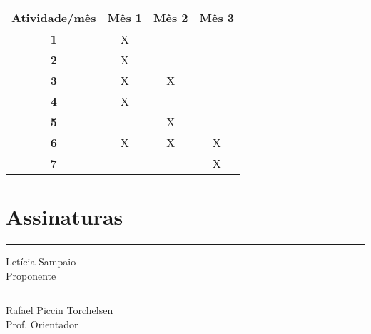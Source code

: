 \documentclass[tcc-proposta]{texufpel}
\begin{document}
\begin{table}[]
\centering
\begin{tabular}{|c|c|c|c|}
\hline
\textbf{Atividade/mês} & \textbf{Mês 1} & \textbf{Mês 2} & \textbf{Mês 3} \\ \hline
\textbf{1}             & X              &                &                \\ \hline
\textbf{2}             & X              &                &                \\ \hline
\textbf{3}             & X              & X              &                \\ \hline
\textbf{4}             & X              &                &                \\ \hline
\textbf{5}             &                & X              &                \\ \hline
\textbf{6}             & X              & X              & X              \\ \hline
\textbf{7}             &                &                & X              \\ \hline
\end{tabular}
\end{table}




\chapter{Assinaturas}
\vspace{2cm}

\begin{center}
\rule{8cm}{.3mm}
\medskip

	Letícia Sampaio\\
	Proponente

\end{center}

\vspace{4cm}

\begin{center}
\rule{8cm}{.3mm}
\medskip

	Rafael Piccin Torchelsen\\
	Prof. Orientador

\end{center}
\end{document}
